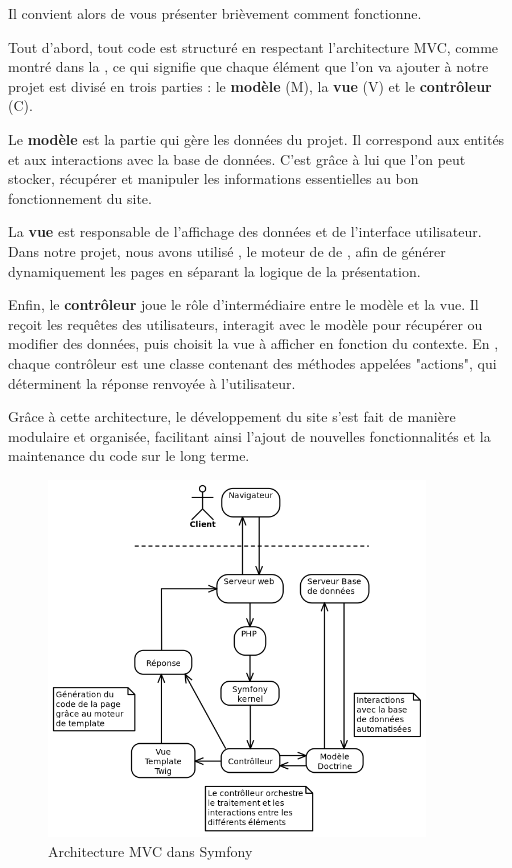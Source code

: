 Il convient alors de vous présenter brièvement comment  fonctionne.

Tout d'abord, tout code  est structuré en respectant l'architecture MVC, comme montré dans la , ce qui signifie que chaque élément que l'on va ajouter à notre projet est divisé en trois parties : le \textbf{modèle} (M), la \textbf{vue} (V) et le \textbf{contrôleur} (C). 

Le \textbf{modèle} est la partie qui gère les données du projet. Il correspond aux entités et aux interactions avec la base de données. C’est grâce à lui que l’on peut stocker, récupérer et manipuler les informations essentielles au bon fonctionnement du site.

La \textbf{vue} est responsable de l'affichage des données et de l'interface utilisateur. Dans notre projet, nous avons utilisé , le moteur de  de , afin de générer dynamiquement les pages  en séparant la logique de la présentation.

Enfin, le \textbf{contrôleur} joue le rôle d’intermédiaire entre le modèle et la vue. Il reçoit les requêtes des utilisateurs, interagit avec le modèle pour récupérer ou modifier des données, puis choisit la vue à afficher en fonction du contexte. En , chaque contrôleur est une classe  contenant des méthodes appelées "actions", qui déterminent la réponse renvoyée à l’utilisateur.

Grâce à cette architecture, le développement du site s’est fait de manière modulaire et organisée, facilitant ainsi l’ajout de nouvelles fonctionnalités et la maintenance du code sur le long terme.
\bigskip

\begin{figure}[H]
    \centering
    \includegraphics[width=10cm]{assets/pictures/mvc.png}
    \caption{Architecture MVC dans Symfony}
    \label{mvc}
\end{figure}
\bigskip

